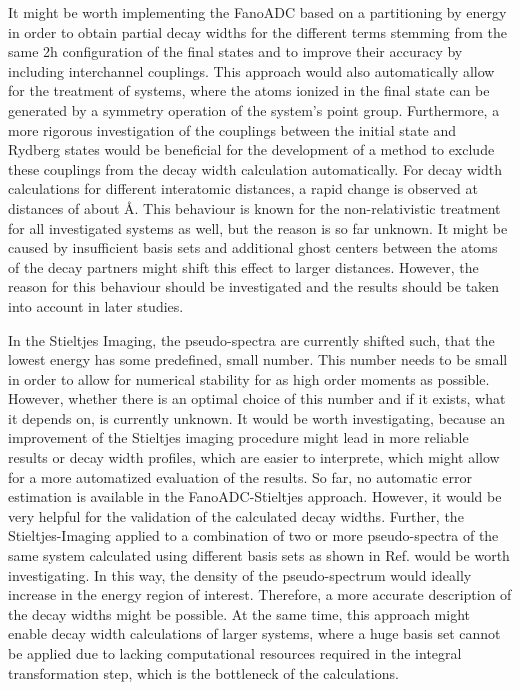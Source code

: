It might be worth implementing the FanoADC based on a partitioning by energy in
order to obtain partial decay widths for the different terms stemming from the
same 2h configuration of the final states and to
improve their accuracy by including interchannel couplings. This approach
would also automatically allow for the treatment of systems, where the
atoms ionized in the final state can be generated by a symmetry operation
of the system's point group.
Furthermore, a more rigorous investigation of the couplings between the
initial state and Rydberg states would be beneficial for the development
of a method to exclude these couplings from the decay width calculation
automatically.
For decay width calculations for different interatomic distances,
a rapid change is observed at distances of about \unit[10 -- 15]{\AA}.
This behaviour is known for the non-relativistic treatment for all
investigated systems as well,
but the reason is so far unknown. It might be caused by insufficient
basis sets and additional ghost centers between the atoms of the decay partners
might shift this effect to larger distances. However, the reason for
this behaviour should be investigated and the results should be taken
into account in later studies.

In the Stieltjes Imaging, the pseudo-spectra are currently shifted such,
that the lowest energy has some predefined, small number. This number needs
to be small in order to allow for numerical stability for as high order
moments as possible. However, whether there is an optimal choice of this
number and if it exists, what it depends on, is currently unknown.
It would be worth investigating, because an improvement of the Stieltjes
imaging procedure might lead in more reliable results or decay width profiles,
which are easier to interprete, which might allow for a more automatized
evaluation of the results.
So far, no automatic error estimation is available in the FanoADC-Stieltjes
approach. However, it would be very helpful for the validation of the
calculated decay widths.
Further, the Stieltjes-Imaging applied to a combination of two or more
pseudo-spectra of the same system calculated using different basis sets
as shown in Ref. \cite{Reinhardt79} would be worth investigating.
In this way, the density of the pseudo-spectrum would ideally increase in the
energy region of interest. Therefore, a more accurate description of the
decay widths might be possible. At the same time, this approach might enable
decay width calculations of larger systems, where a huge basis set cannot be
applied due to lacking computational resources required in the integral
transformation step, which is the bottleneck of the calculations.

